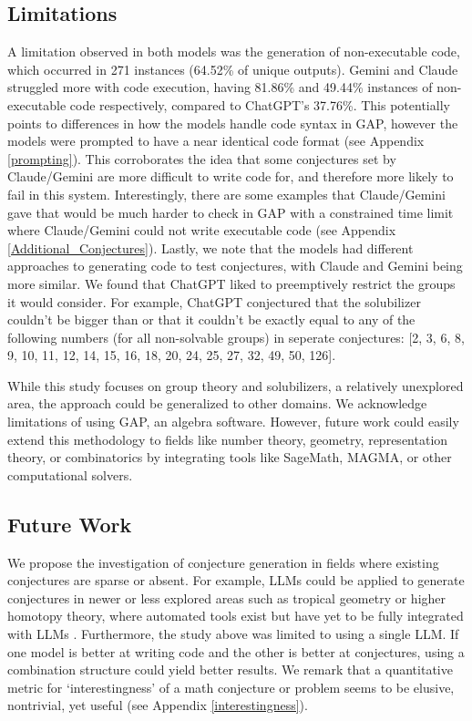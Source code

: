 \documentclass{article}
\begin{document}
\subsection{Limitations}
A limitation observed in both models was the generation of non-executable code, which occurred in 271 instances (64.52\% of unique outputs). Gemini and Claude struggled more with code execution, having 81.86\% and 49.44\% instances of non-executable code respectively, compared to ChatGPT’s 37.76\%. This potentially points to differences in how the models handle code syntax in GAP, however the models were prompted to have a near identical code format (see Appendix \ref{prompting}). This corroborates the idea that some conjectures set by Claude/Gemini are more difficult to write code for, and therefore more likely to fail in this system. Interestingly, there are some examples that Claude/Gemini gave that would be much harder to check in GAP with a constrained time limit where Claude/Gemini could not write executable code (see Appendix \ref{Additional_Conjectures}).
Lastly, we note that the models had different approaches to generating code to test conjectures, with Claude and Gemini being more similar. We found that ChatGPT liked to preemptively restrict the groups it would consider. For example, ChatGPT conjectured that the solubilizer couldn't be bigger than or that it couldn't be exactly equal to any of the following numbers (for all non-solvable groups) in seperate conjectures: [2, 3, 6, 8, 9, 10, 11, 12, 14, 15, 16, 18, 20, 24, 25, 27, 32, 49, 50, 126].

While this study focuses on group theory and solubilizers, a relatively unexplored area, the approach could be generalized to other domains. We acknowledge limitations of using GAP, an algebra software. However, future work could easily extend this methodology to fields like number theory, geometry, representation theory, or combinatorics by integrating tools like SageMath, MAGMA, or other computational solvers. 

\subsection{Future Work}
We propose the investigation of conjecture generation in fields where existing conjectures are sparse or absent. For example, LLMs could be applied to generate conjectures in newer or less explored areas such as tropical geometry or higher homotopy theory, where automated tools exist but have yet to be fully integrated with LLMs \cite{sagemath, heras2010integratingmultiplesourcesanswer}. Furthermore, the study above was limited to using a single LLM. If one model is better at writing code and the other is better at conjectures, using a combination structure could yield better results. We remark that a quantitative metric for `interestingness' of a math conjecture or problem seems to be elusive, nontrivial, yet useful (see Appendix \ref{interestingness}).
\end{document}
